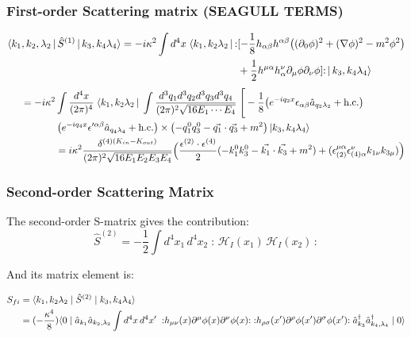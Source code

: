 \documentclass[12pt,a4paper]{article}
\begin{document}
\subsubsection*{First-order Scattering matrix (SEAGULL TERMS)}
\begin{align}
\langle k_1, k_2, \lambda_2 \,|\, \hat{S}^{(1)} \,|\, k_3, k_4 \lambda_4 \rangle
= - i\kappa^2 \int d^4x \;\langle k_1, k_2\lambda_2 \,|\,
{:} &[-\frac18 h_{\alpha\beta} h^{\alpha\beta}
\!\left((\partial_0 \phi)^2+(\nabla\phi)^2 - m^2\phi^2\right)
\\& + \frac{1}{2} h^{\mu\alpha} h^\nu_\alpha   \partial_\mu\phi \partial_\nu\phi]
{:}\,|\, k_3, k_4 \lambda_4 \rangle
\notag\\
\end{align}
\begin{align}
\,\,\,\,\,\,\,\,\,\, = -i\kappa^2 &\int \frac{d^4x}{(2\pi)^4} \;\langle k_1, k_2\lambda_2 \,|\;
\int \frac{d^3q_1 d^3q_2 d^3q_3 d^3q_4}{(2\pi)^2\sqrt{16E_1\cdots E_4}}\;
\Bigg[-\frac18
\!\left(e^{-iq_2 x}\epsilon_{\alpha\beta}\hat{a}_{q_2\lambda_2}+\text{h.c.}\right)
\\
&\left(e^{-iq_4 x}\epsilon '^{\alpha\beta}\hat{a}_{q_4\lambda_4}+\text{h.c.}\right)\times \left(-q^0_1q_3^0-\vec{q_1}\cdot \vec{q_3}+m^2\right) |k_3, k_4\lambda_4\rangle\\
&= i\kappa ^2 \frac{\delta^{(4)(K_{in}-K_{out})}}{(2\pi)^2\sqrt{16E_1E_2E_3E_4}}\Bigl(\frac{\epsilon^{(2)}\cdot\epsilon^{(4)}}{2}
(-k_1^0k_3^0-\vec{k_1}\cdot\vec{k_3}+m^2)+(\epsilon_{(2)}^{\mu\alpha}\epsilon_{(4)\alpha}^\nu k_{1\nu}k_{3\mu})\Bigr)
\end{align} 

\subsubsection*{Second-order Scattering Matrix}
The second-order S-matrix gives the contribution:
\begin{equation}
    \hat{S}^{(2)} = -\frac{1}{2} \int d^4x_1\, d^4x_2\; {:}\,\mathcal{H}_I(x_1)\,\mathcal{H}_I(x_2)\,{:}
\end{equation}

And its matrix element is:

\begin{align*}
S_{fi}
&= \langle k_1 ,k_2 \lambda_2 \mid \hat{S}^{(2)} \mid k_3,k_4\lambda_4\rangle \notag\\
&=  (-\frac{\kappa^4}{8}) \langle 0 \mid \hat{a}_{k_1} \hat{a}_{k_2,\lambda_2}
\int d^4x\, d^4x'\;\;
{:}
h_{\mu\nu}(x)\partial^\mu\phi(x)\partial^\nu\phi(x){:}
\;
{:}h_{\rho\sigma}(x')\partial^\rho\phi(x')\partial^\sigma\phi(x'){:}\;
\hat{a}^{\dagger}_{k_3}\hat{a}^{\dagger}_{k_4,\lambda_4}
\mid 0\rangle 
\end{align*}
\end{document}
